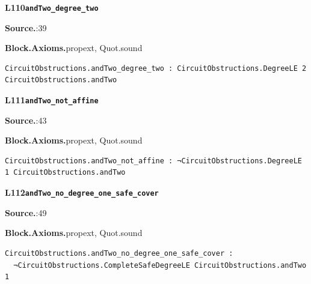 \par\medskip\noindent\begin{minipage}{\textwidth}
{\small\bfseries L110\enspace\texttt{andTwo\_degree\_two}\par}
{\footnotesize\raggedright\textbf{Source.}\enspace{}:39\par
\textbf{Block.}\quad\textbf{Axioms.}\enspace propext, Quot.sound\par}\nopagebreak
\begin{lstlisting}
CircuitObstructions.andTwo_degree_two : CircuitObstructions.DegreeLE 2 CircuitObstructions.andTwo
\end{lstlisting}
\end{minipage}\par

\par\medskip\noindent\begin{minipage}{\textwidth}
{\small\bfseries L111\enspace\texttt{andTwo\_not\_affine}\par}
{\footnotesize\raggedright\textbf{Source.}\enspace{}:43\par
\textbf{Block.}\quad\textbf{Axioms.}\enspace propext, Quot.sound\par}\nopagebreak
\begin{lstlisting}
CircuitObstructions.andTwo_not_affine : ¬CircuitObstructions.DegreeLE 1 CircuitObstructions.andTwo
\end{lstlisting}
\end{minipage}\par

\par\medskip\noindent\begin{minipage}{\textwidth}
{\small\bfseries L112\enspace\texttt{andTwo\_no\_degree\_one\_safe\_cover}\par}
{\footnotesize\raggedright\textbf{Source.}\enspace{}:49\par
\textbf{Block.}\quad\textbf{Axioms.}\enspace propext, Quot.sound\par}\nopagebreak
\begin{lstlisting}
CircuitObstructions.andTwo_no_degree_one_safe_cover :
  ¬CircuitObstructions.CompleteSafeDegreeLE CircuitObstructions.andTwo 1
\end{lstlisting}
\end{minipage}\par

